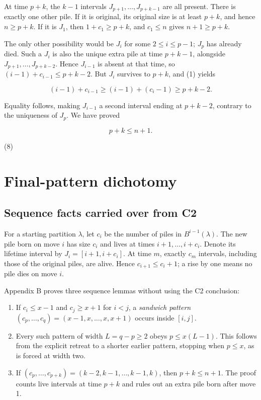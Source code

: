 \documentclass[11pt,a4paper]{article}
\begin{document}
At time $p+k$, the $k-1$ intervals $J_{p+1},\ldots,J_{p+k-1}$ are all present. There is exactly one other pile. If it is original, its original size is at least $p+k$, and hence $n\ge p+k$. If it is $J_1$, then $1+c_1\ge p+k$, and $c_1\le n$ gives $n+1\ge p+k$.

The only other possibility would be $J_i$ for some $2\le i\le p-1$; $J_p$ has already died. Such a $J_i$ is also the unique extra pile at time $p+k-1$, alongside $J_{p+1},\ldots,J_{p+k-2}$. Hence $J_{i-1}$ is absent at that time, so $(i-1)+c_{i-1}\le p+k-2$. But $J_i$ survives to $p+k$, and (1) yields

\[
(i-1)+c_{i-1}\ge(i-1)+(c_i-1)\ge p+k-2.
\]

Equality follows, making $J_{i-1}$ a second interval ending at $p+k-2$, contrary to the uniqueness of $J_p$. We have proved

\[
\boxed{p+k\le n+1}.
\]

(8)

\section{Final-pattern dichotomy}
\subsection{Sequence facts carried over from C2}

For a starting partition $\lambda$, let $c_i$ be the number of piles in $B^{i-1}(\lambda)$. The new pile born on move $i$ has size $c_i$ and lives at times $i+1,\ldots,i+c_i$. Denote its lifetime interval by $J_i=[i+1,i+c_i]$. At time $m$, exactly $c_m$ intervals, including those of the original piles, are alive. Hence $c_{i+1}\le c_i+1$; a rise by one means no pile dies on move $i$.

Appendix B proves three sequence lemmas without using the C2 conclusion:

\begin{enumerate}
\item If $c_i\le x-1$ and $c_j\ge x+1$ for $i<j$, a \emph{sandwich pattern} $(c_p,\ldots,c_q)=(x-1,x,\ldots,x,x+1)$ occurs inside $[i,j]$.
\item Every such pattern of width $L=q-p\ge2$ obeys $p\le x(L-1)$. This follows from the explicit retreat to a shorter earlier pattern, stopping when $p\le x$, as is forced at width two.
\item If $(c_p,\ldots,c_{p+k})=(k-2,k-1,\ldots,k-1,k)$, then $p+k\le n+1$. The proof counts live intervals at time $p+k$ and rules out an extra pile born after move 1.
\end{enumerate}
\end{document}
